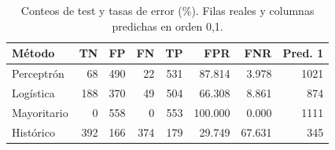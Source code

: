\begin{table}[htbp]
\centering\small
\caption{Conteos de test y tasas de error (\%). Filas reales y columnas predichas en orden 0,1.}\label{tab:confusiones}
\begin{tabular}{lrrrrrrr}\toprule
Método & TN & FP & FN & TP & FPR & FNR & Pred. 1 \\ \midrule
Perceptrón & 68 & 490 & 22 & 531 & 87.814 & 3.978 & 1021 \\
Logística & 188 & 370 & 49 & 504 & 66.308 & 8.861 & 874 \\
Mayoritario & 0 & 558 & 0 & 553 & 100.000 & 0.000 & 1111 \\
Histórico & 392 & 166 & 374 & 179 & 29.749 & 67.631 & 345 \\
\bottomrule\end{tabular}
\end{table}

